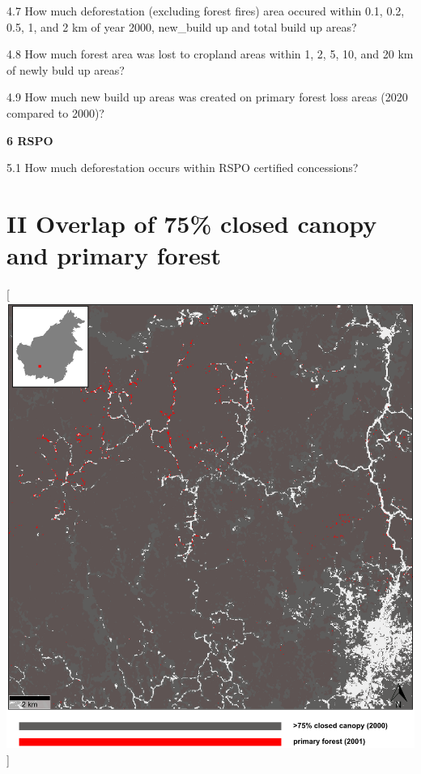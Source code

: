 \documentclass[
  letterpaper,
  DIV=11,
  numbers=noendperiod]{scrreprt}
\begin{document}
4.7 How much deforestation (excluding forest fires) area occured within
0.1, 0.2, 0.5, 1, and 2 km of year 2000, new\_build up and total build
up areas?

4.8 How much forest area was lost to cropland areas within 1, 2, 5, 10,
and 20 km of newly buld up areas?

4.9 How much new build up areas was created on primary forest loss areas
(2020 compared to 2000)?

\textbf{6 RSPO}

5.1 How much deforestation occurs within RSPO certified concessions?

\newpage

\hypertarget{overlap-of-75-closed-canopy-and-primary-forest}{%
\section*{\texorpdfstring{\textsc{II} Overlap of 75\% closed canopy and
primary
forest}{ Overlap of 75\% closed canopy and primary forest}}\label{overlap-of-75-closed-canopy-and-primary-forest}}


\color{white}

{[}\includegraphics[width=1\textwidth,height=\textheight]{text/../code/results/maps/fcover2000_75_and_primary_forest.png}{]}
\normalcolor
\end{document}

